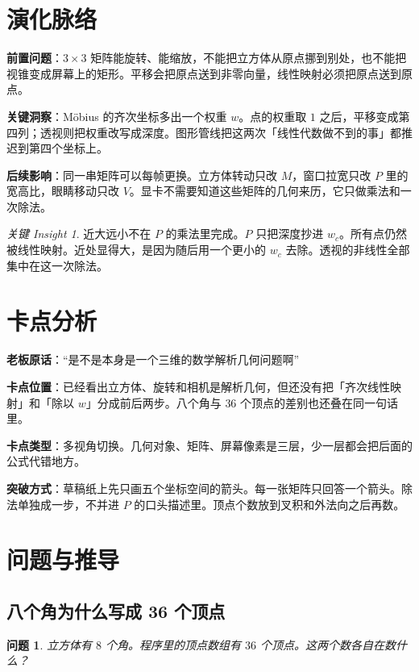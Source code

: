 \documentclass[12pt,a4paper]{article}
\theoremstyle{definition}
\theoremstyle{plain}
\newtheorem{problem}{问题}[section]
\theoremstyle{remark}
\newtheorem*{insight}{关键 Insight}
\begin{document}
\section{演化脉络}

\textbf{前置问题}：$3\times 3$ 矩阵能旋转、能缩放，不能把立方体从原点挪到别处，也不能把视锥变成屏幕上的矩形。平移会把原点送到非零向量，线性映射必须把原点送到原点。

\textbf{关键洞察}：M\"obius 的齐次坐标多出一个权重 $w$。点的权重取 $1$ 之后，平移变成第四列；透视则把权重改写成深度。图形管线把这两次「线性代数做不到的事」都推迟到第四个坐标上。

\textbf{后续影响}：同一串矩阵可以每帧更换。立方体转动只改 $M$，窗口拉宽只改 $P$ 里的宽高比，眼睛移动只改 $V$。显卡不需要知道这些矩阵的几何来历，它只做乘法和一次除法。

\begin{insight}
近大远小不在 $P$ 的乘法里完成。$P$ 只把深度抄进 $w_c$。所有点仍然被线性映射。近处显得大，是因为随后用一个更小的 $w_c$ 去除。透视的非线性全部集中在这一次除法。
\end{insight}

\section{卡点分析}

\textbf{老板原话}：``是不是本身是一个三维的数学解析几何问题啊''

\textbf{卡点位置}：已经看出立方体、旋转和相机是解析几何，但还没有把「齐次线性映射」和「除以 $w$」分成前后两步。八个角与 $36$ 个顶点的差别也还叠在同一句话里。

\textbf{卡点类型}：多视角切换。几何对象、矩阵、屏幕像素是三层，少一层都会把后面的公式代错地方。

\textbf{突破方式}：草稿纸上先只画五个坐标空间的箭头。每一张矩阵只回答一个箭头。除法单独成一步，不并进 $P$ 的口头描述里。顶点个数放到叉积和外法向之后再数。

\section{问题与推导}

\subsection{八个角为什么写成 36 个顶点}

\begin{problem}
立方体有 $8$ 个角。程序里的顶点数组有 $36$ 个顶点。这两个数各自在数什么？
\end{problem}
\end{document}
